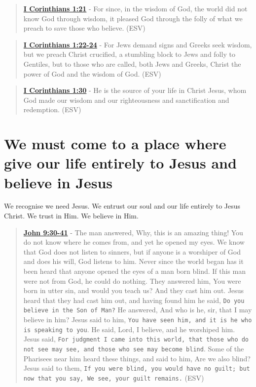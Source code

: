 \documentclass[11pt]{article}
\begin{document}
\begin{quote}
\textbf{\href{https://www.biblegateway.com/passage/?search=1\%20Corinthians\%201\%3A21\&version=ESV}{I Corinthians 1:21}} - For since, in the wisdom of God, the world did not know God through wisdom, it pleased God through the folly of what we preach to save those who believe. (ESV)
\end{quote}

\begin{quote}
\textbf{\href{https://www.biblegateway.com/passage/?search=1\%20Corinthians\%201\%3A22-24\&version=ESV}{I Corinthians 1:22-24}} - For Jews demand signs and Greeks seek wisdom, but we preach Christ crucified, a stumbling block to Jews and folly to Gentiles, but to those who are called, both Jews and Greeks, Christ the power of God and the wisdom of God. (ESV)
\end{quote}

\begin{quote}
\textbf{\href{https://www.biblegateway.com/passage/?search=1\%20Corinthians\%201\%3A30\&version=ESV}{I Corinthians 1:30}} - He is the source of your life in Christ Jesus, whom God made our wisdom and our righteousness and sanctification and redemption. (ESV)
\end{quote}

\section{We must come to a place where give our life entirely to Jesus and believe in Jesus}
\label{sec:org6aebcc4}
We recognise we need Jesus.
We entrust our soul and our life entirely to Jesus Christ.
We trust in Him. We believe in Him.

\begin{quote}
\textbf{\href{https://www.biblegateway.com/passage/?search=John\%209\%3A30-41\&version=ESV}{John 9:30-41}} - The man answered, Why, this is an amazing thing! You do not know where he comes from, and yet he opened my eyes. We know that God does not listen to sinners, but if anyone is a worshiper of God and does his will, God listens to him. Never since the world began has it been heard that anyone opened the eyes of a man born blind. If this man were not from God, he could do nothing. They answered him, You were born in utter sin, and would you teach us? And they cast him out. Jesus heard that they had cast him out, and having found him he said, \texttt{Do you believe in the Son of Man?} He answered, And who is he, sir, that I may believe in him? Jesus said to him, \texttt{You have seen him, and it is he who is speaking to you}. He said, Lord, I believe, and he worshiped him. Jesus said, \texttt{For judgment I came into this world, that those who do not see may see, and those who see may become blind}. Some of the Pharisees near him heard these things, and said to him, Are we also blind? Jesus said to them, \texttt{If you were blind, you would have no guilt; but now that you say, We see, your guilt remains.} (ESV)
\end{quote}
\end{document}
